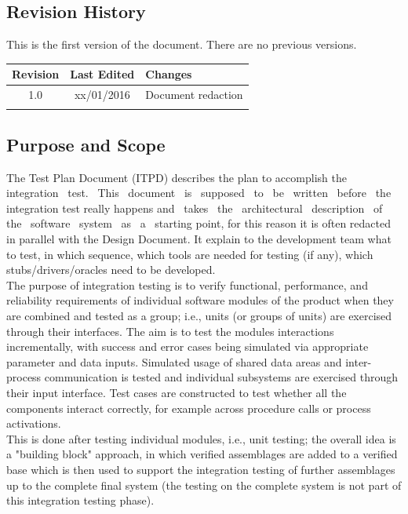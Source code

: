 \documentclass[a4paper,11pt]{report} %
\begin{document}
	\subsection{Revision History}
		This is the first version of the document. There are no previous versions.
		
		\begin{center}
			\begin{tabular}{| l | p{2.5cm} | p{9cm} |}\hline
				\multicolumn{1}{|c|}{\textbf{Revision}} & \multicolumn{1}{|c|}{\textbf{Last Edited}} & \textbf{Changes}\\\hline
				\multicolumn{1}{|c|}{1.0} & \multicolumn{1}{|c|}{xx/01/2016} & Document redaction\\\hline
				 & & \\\hline
			\end{tabular}
		\end{center}
		
	\subsection{Purpose and Scope}
		The Test Plan Document (ITPD) describes the plan to accomplish the  integration  test.  This  document  is  supposed  to  be  written  before  the  integration  test  really  happens and  takes  the  architectural  description  of  the  software  system  as  a  starting point, for this reason it is often redacted in parallel with the Design Document. It explain to the development team what to test, in which sequence, which tools are needed for testing (if any), which stubs/drivers/oracles need to be developed.\\		
		The purpose of integration testing is to verify functional, performance, and reliability requirements of individual software modules of the product when they are combined and tested as a group; i.e., units (or groups of units) are exercised through their interfaces. The aim is to test the modules interactions incrementally, with success and error cases being simulated via appropriate parameter and data inputs. Simulated usage of shared data areas and inter-process communication is tested and individual subsystems are exercised through their input interface. Test cases are constructed to test whether all the components interact correctly, for example across procedure calls or process activations.\\
		This is done after testing individual modules, i.e., unit testing; the overall idea is a "building block" approach, in which verified assemblages are added to a verified base which is then used to support the integration testing of further assemblages up to the complete final system (the testing on the complete system is not part of this integration testing phase).
		
\end{document}
